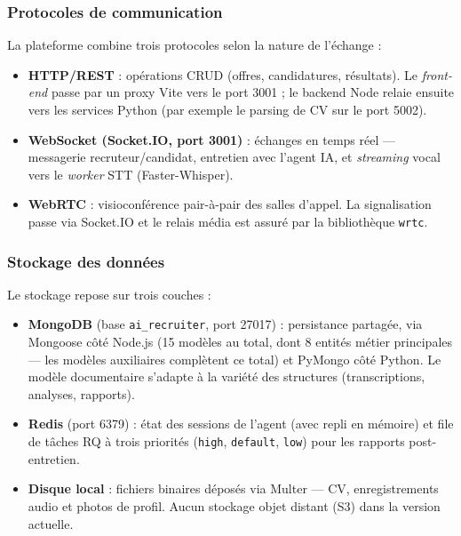 \subsubsection{Protocoles de communication}

La plateforme combine trois protocoles selon la nature de l'échange :

\begin{itemize}
  \item \textbf{HTTP/REST} : opérations CRUD (offres, candidatures, résultats). Le
        \textit{front-end} passe par un proxy Vite vers le port 3001 ; le backend Node relaie
        ensuite vers les services Python (par exemple le parsing de CV sur le port 5002).
  \item \textbf{WebSocket (Socket.IO, port 3001)} : échanges en temps réel --- messagerie
        recruteur/candidat, entretien avec l'agent IA, et \textit{streaming} vocal vers le
        \textit{worker} STT (Faster-Whisper).
  \item \textbf{WebRTC} : visioconférence pair-à-pair des salles d'appel. La signalisation
        passe via Socket.IO et le relais média est assuré par la bibliothèque \texttt{wrtc}.
\end{itemize}

\subsubsection{Stockage des données}

Le stockage repose sur trois couches :

\begin{itemize}
  \item \textbf{MongoDB} (base \texttt{ai\_recruiter}, port 27017) : persistance partagée,
        via Mongoose côté Node.js (15 modèles au total, dont 8 entités métier principales --- les modèles auxiliaires complètent ce total) et PyMongo côté Python. Le modèle documentaire
        s'adapte à la variété des structures (transcriptions, analyses, rapports).
  \item \textbf{Redis} (port 6379) : état des sessions de l'agent (avec repli en mémoire) et
        file de tâches RQ à trois priorités (\texttt{high}, \texttt{default}, \texttt{low})
        pour les rapports post-entretien.
  \item \textbf{Disque local} : fichiers binaires déposés via Multer --- CV, enregistrements
        audio et photos de profil. Aucun stockage objet distant (S3) dans la version actuelle.
\end{itemize}

